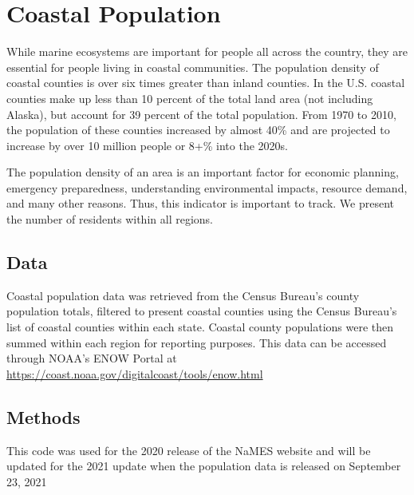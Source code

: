 \documentclass[
]{book}
\begin{document}
\hypertarget{coastal-population}{%
\chapter{Coastal Population}\label{coastal-population}}

While marine ecosystems are important for people all across the country, they are essential for people living in coastal communities. The population density of coastal counties is over six times greater than inland counties. In the U.S. coastal counties make up less than 10 percent of the total land area (not including Alaska), but account for 39 percent of the total population. From 1970 to 2010, the population of these counties increased by almost 40\% and are projected to increase by over 10 million people or 8+\% into the 2020s.

The population density of an area is an important factor for economic planning, emergency preparedness, understanding environmental impacts, resource demand, and many other reasons. Thus, this indicator is important to track. We present the number of residents within all regions.

\hypertarget{data-9}{%
\section{Data}\label{data-9}}

Coastal population data was retrieved from the Census Bureau's county population totals, filtered to present coastal counties using the Census Bureau's list of coastal counties within each state. Coastal county populations were then summed within each region for reporting purposes. This data can be accessed through NOAA's ENOW Portal at \url{https://coast.noaa.gov/digitalcoast/tools/enow.html}

\hypertarget{methods-8}{%
\section{Methods}\label{methods-8}}

This code was used for the 2020 release of the NaMES website and will be updated for the 2021 update when the population data is released on September 23, 2021
\end{document}
